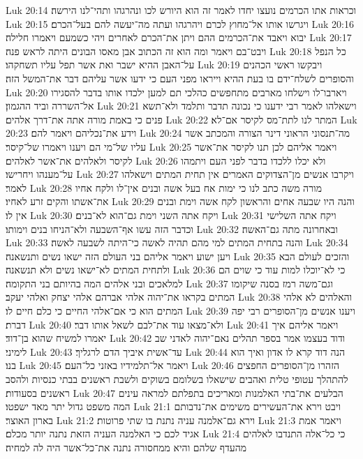 Luk 20:14  וכראות אתו הכרמים נועצו יחדו לאמר זה הוא היורש לכו ונהרגהו ותהי־לנו הירשה׃
Luk 20:15  ויגרשו אותו אל־מחוץ לכרם ויהרגהו ועתה מה־יעשה להם בעל־הכרם׃
Luk 20:16  יבוא ויאבד את־הכרמים ההם ויתן את־הכרם לאחרים ויהי כשמעם ויאמרו חלילה׃
Luk 20:17  ויבט־בם ויאמר ומה הוא זה הכתוב אבן מאסו הבונים היתה לראש פנה׃
Luk 20:18  כל הנפל על־האבן ההיא ישבר ואת אשר תפל עליו תשחקהו׃
Luk 20:19  ויבקשו ראשי הכהנים והסופרים לשלח־ידם בו בעת ההיא וייראו מפני העם כי ידעו אשר עליהם דבר את־המשל הזה׃
Luk 20:20  ויארבו־לו וישלחו מארבים מתחפשים כהלכי תם למען ילכדו אותו בדבר להסגירו אל־השררה וביד ההגמון׃
Luk 20:21  וישאלהו לאמר רבי ידענו כי נכונה תדבר ותלמד ולא־תשא פנים כי באמת מורה אתה את־דרך אלהים׃
Luk 20:22  המתר לנו לתת־מס לקיסר אם־לא׃
Luk 20:23  וידע את־נכליהם ויאמר להם׃
Luk 20:24  מה־תנסוני הראוני דינר הצורה והמכתב אשר עליו של־מי הם ויענו ויאמרו של־קיסר׃
Luk 20:25  ויאמר אליהם לכן תנו לקיסר את־אשר לקיסר ולאלהים את־אשר לאלהים׃
Luk 20:26  ולא יכלו ללכדו בדבר לפני העם ויתמהו על־מענהו ויחרישו׃
Luk 20:27  ויקרבו אנשים מן־הצדוקים האמרים אין תחית המתים וישאלהו לאמר׃
Luk 20:28  מורה משה כתב לנו כי ימות אח בעל אשה ובנים אין־לו ולקח אחיו את־אשתו והקים זרע לאחיו׃
Luk 20:29  והנה היו שבעה אחים והראשון לקח אשה וימת ובנים אין לו׃
Luk 20:30  ויקח אתה השני וימת גם־הוא לא־בנים׃
Luk 20:31  ויקח אתה השלישי וכדבר הזה עשו אף־השבעה ולא־הניחו בנים וימותו׃
Luk 20:32  ובאחרונה מתה גם־האשה׃
Luk 20:33  והנה בתחית המתים למי מהם תהיה לאשה כי־היתה לשבעה לאשה׃
Luk 20:34  ויען ישוע ויאמר אליהם בני העולם הזה ישאו נשים ותנשאנה׃
Luk 20:35  והזכים לעולם הבא ולתחית המתים לא־ישאו נשים ולא תנשאנה׃
Luk 20:36  כי לא־יוכלו למות עוד כי שוים הם למלאכים ובני אלהים המה בהיותם בני התקומה׃
Luk 20:37  וגם־משה רמז בסנה שיקומו המתים בקראו את־יהוה אלהי אברהם אלהי יצחק ואלהי יעקב׃
Luk 20:38  והאלהים לא אלהי המתים הוא כי אם־אלהי החיים כי כלם חיים לו׃
Luk 20:39  ויענו אנשים מן־הסופרים רבי יפה דברת׃
Luk 20:40  ולא־מצאו עוד את־לבם לשאל אותו דבר׃
Luk 20:41  ויאמר אליהם איך יאמרו למשיח שהוא בן־דוד׃
Luk 20:42  ודוד בעצמו אמר בספר תהלים נאם־יהוה לאדני שב לימיני׃
Luk 20:43  עד־אשית איביך הדם לרגליך׃
Luk 20:44  הנה דוד קרא לו אדון ואיך הוא בנו׃
Luk 20:45  ויאמר אל־תלמידיו באזני כל־העם׃
Luk 20:46  הזהרו מן־הסופרים החפצים להתהלך עטופי טלית ואהבים שישאלו בשלומם בשוקים ולשבת ראשנים בבתי כנסיות ולהסב ראשנים בסעודות׃
Luk 20:47  הבלעים את־בתי האלמנות ומאריכים בתפלתם למראה עינים המה משפט גדול יתר מאד ישפטו׃
Luk 21:1  ויבט וירא את־העשירים משימים את־נדבותם בארון האוצר׃
Luk 21:2  וירא גם־אלמנה עניה נתנת בו שתי פרוטות׃
Luk 21:3  ויאמר אמת אגיד לכם כי האלמנה העניה הזאת נתנה יותר מכלם׃
Luk 21:4  כי כל־אלה התנדבו לאלהים מהעדף שלהם והיא ממחסורה נתנה את־כל־אשר היה לה למחיה׃
